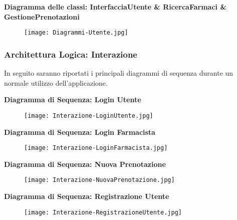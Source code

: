 \newpage
\textbf{Diagramma delle classi: InterfacciaUtente \& RicercaFarmaci \& GestionePrenotazioni }

\begin{figure}[h!]
    \begin{center}
        \texttt{[image: Diagrammi-Utente.jpg]}
    \end{center}
\end{figure}
\hfill \break

\newpage
\subsubsection{Architettura Logica: Interazione}

In seguito saranno riportati i principali diagrammi di sequenza durante un normale utilizzo dell'applicazione.
\hfill \break

\textbf{Diagramma di Sequenza: Login Utente}

\begin{figure}[h!]
    \begin{center}
        \texttt{[image: Interazione-LoginUtente.jpg]}
    \end{center}
\end{figure}
\hfill \break

\textbf{Diagramma di Sequenza: Login Farmacista}

\begin{figure}[h!]
    \begin{center}
        \texttt{[image: Interazione-LoginFarmacista.jpg]}
    \end{center}
\end{figure}
\hfill \break

\textbf{Diagramma di Sequenza: Nuova Prenotazione}

\begin{figure}[h!]
    \begin{center}
        \texttt{[image: Interazione-NuovaPrenotazione.jpg]}
    \end{center}
\end{figure}

\newpage

\textbf{Diagramma di Sequenza: Registrazione Utente}

\begin{figure}[h!]
    \begin{center}
        \texttt{[image: Interazione-RegistrazioneUtente.jpg]}
    \end{center}
\end{figure}
\hfill \break

